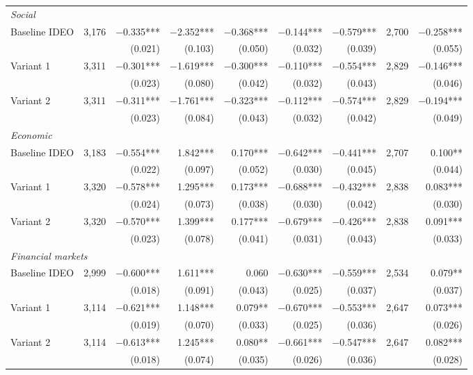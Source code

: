 \begin{table}[ht]
{\begin{tabular}{lrrrrrrrr}
\multicolumn{9}{l}{\emph{Social}} \\
\quad Baseline IDEO & 3,176 & $-$0.335*** & $-$2.352*** & $-$0.368*** & $-$0.144*** & $-$0.579*** & 2,700 & $-$0.258*** \\
 & & (0.021) & (0.103) & (0.050) & (0.032) & (0.039) & & (0.055) \\
\quad Variant 1 & 3,311 & $-$0.301*** & $-$1.619*** & $-$0.300*** & $-$0.110*** & $-$0.554*** & 2,829 & $-$0.146*** \\
 & & (0.023) & (0.080) & (0.042) & (0.032) & (0.043) & & (0.046) \\
\quad Variant 2 & 3,311 & $-$0.311*** & $-$1.761*** & $-$0.323*** & $-$0.112*** & $-$0.574*** & 2,829 & $-$0.194*** \\
 & & (0.023) & (0.084) & (0.043) & (0.032) & (0.042) & & (0.049) \\
\multicolumn{9}{l}{\emph{Economic}} \\
\quad Baseline IDEO & 3,183 & $-$0.554*** & 1.842*** & 0.170*** & $-$0.642*** & $-$0.441*** & 2,707 & 0.100** \\
 & & (0.022) & (0.097) & (0.052) & (0.030) & (0.045) & & (0.044) \\
\quad Variant 1 & 3,320 & $-$0.578*** & 1.295*** & 0.173*** & $-$0.688*** & $-$0.432*** & 2,838 & 0.083*** \\
 & & (0.024) & (0.073) & (0.038) & (0.030) & (0.042) & & (0.030) \\
\quad Variant 2 & 3,320 & $-$0.570*** & 1.399*** & 0.177*** & $-$0.679*** & $-$0.426*** & 2,838 & 0.091*** \\
 & & (0.023) & (0.078) & (0.041) & (0.031) & (0.043) & & (0.033) \\
\multicolumn{9}{l}{\emph{Financial markets}} \\
\quad Baseline IDEO & 2,999 & $-$0.600*** & 1.611*** & 0.060 & $-$0.630*** & $-$0.559*** & 2,534 & 0.079** \\
 & & (0.018) & (0.091) & (0.043) & (0.025) & (0.037) & & (0.037) \\
\quad Variant 1 & 3,114 & $-$0.621*** & 1.148*** & 0.079** & $-$0.670*** & $-$0.553*** & 2,647 & 0.073*** \\
 & & (0.019) & (0.070) & (0.033) & (0.025) & (0.036) & & (0.026) \\
\quad Variant 2 & 3,114 & $-$0.613*** & 1.245*** & 0.080** & $-$0.661*** & $-$0.547*** & 2,647 & 0.082*** \\
 & & (0.018) & (0.074) & (0.035) & (0.026) & (0.036) & & (0.028) \\
\bottomrule

\end{tabular}}
\end{table}
